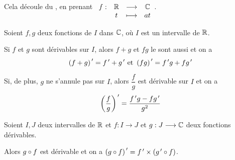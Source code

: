 \begin{dem}
Cela découle du , en prenant \(\begin{array}[t]{cccc}f : & \mathbb{R} & \longrightarrow & \mathbb{C} \\ & t & \longmapsto & at\end{array}\).
\end{dem}

\begin{theo}
Soient \(f,g\) deux fonctions de \(I\) dans \(\mathbb{C}\), où \(I\) est un intervalle de \(\mathbb{R}\).

Si \(f\) et \(g\) sont dérivables sur \(I\), alors \(f+g\) et \(fg\) le sont aussi et on a \[\left(f+g\right)^{\,\prime}=f^{\,\prime}+g^{\,\prime}\text{ et }\left(fg\right)^{\,\prime}=f^{\,\prime} g+fg^{\,\prime}\]

Si, de plus, \(g\) ne s'annule pas sur \(I\), alors \(\dfrac{f}{g}\) est dérivable sur \(I\) et on a \[\left(\dfrac{f}{g}\right)^{\,\prime}=\dfrac{f^{\,\prime} g-fg^{\,\prime}}{g^2}\]
\end{theo}

\begin{dem}
\end{dem}

\begin{theo}
Soient \(I,J\) deux intervalles de \(\mathbb{R}\) et \(f:I\to J\) et \(g:J\longrightarrow\mathbb{C}\) deux fonctions dérivables.

Alors \(g\circ f\) est dérivable et on a \(\left(g\circ f\right)^{\,\prime}=f^{\,\prime}\times\left(g^{\,\prime}\circ f\right)\).
\end{theo}

\begin{dem}
\end{dem}